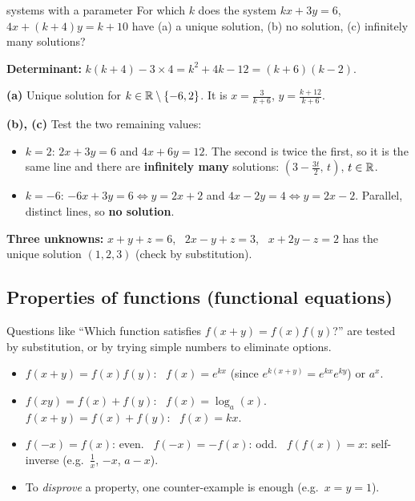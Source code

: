 \begin{example}{systems with a parameter}
For which $k$ does the system $kx+3y=6$, \ $4x+(k+4)y=k+10$ have (a) a unique solution, (b) no solution, (c) infinitely many solutions?\par
\textbf{Determinant:} $k(k+4)-3\times4=k^2+4k-12=(k+6)(k-2)$.\par
\textbf{(a)} Unique solution for $k\in\mathbb{R}\setminus\{-6,2\}$. It is $x=\frac{3}{k+6}$, $y=\frac{k+12}{k+6}$.\par
\textbf{(b), (c)} Test the two remaining values:
\begin{itemize}
  \item $k=2$: $2x+3y=6$ and $4x+6y=12$. The second is twice the first, so it is the same line and there are \textbf{infinitely many} solutions: $\left(3-\frac{3t}{2},\,t\right)$, $t\in\mathbb{R}$.
  \item $k=-6$: $-6x+3y=6\iff y=2x+2$ and $4x-2y=4\iff y=2x-2$. Parallel, distinct lines, so \textbf{no solution}.
\end{itemize}
\textbf{Three unknowns:} $x+y+z=6$, \ $2x-y+z=3$, \ $x+2y-z=2$ has the unique solution $(1,2,3)$ (check by substitution).
\end{example}

\subsection{Properties of functions (functional equations)}
\label{sec:funceq}

\begin{tip}
Questions like ``Which function satisfies $f(x+y)=f(x)f(y)$?'' are tested by substitution, or by trying simple numbers to eliminate options.
\begin{itemize}
  \item $f(x+y)=f(x)f(y)$: \ $f(x)=e^{kx}$ (since $e^{k(x+y)}=e^{kx}e^{ky}$) or $a^x$.
  \item $f(xy)=f(x)+f(y)$: \ $f(x)=\log_a(x)$. \qquad $f(x+y)=f(x)+f(y)$: \ $f(x)=kx$.
  \item $f(-x)=f(x)$: even. \ $f(-x)=-f(x)$: odd. \ $f(f(x))=x$: self-inverse (e.g.\ $\frac1x$, $-x$, $a-x$).
  \item To \emph{disprove} a property, one counter-example is enough (e.g.\ $x=y=1$).
\end{itemize}
\end{tip}

